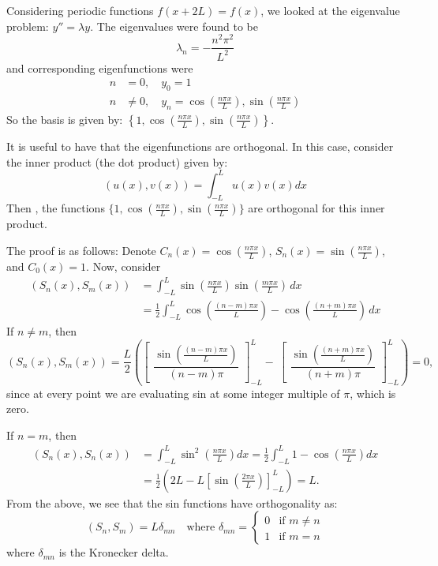 Considering periodic functions $f(x+2L) = f(x)$, we looked at the eigenvalue problem: $y'' = \lambda y$. The eigenvalues were found to be
\[
\lambda_n = -\frac{n^2 \pi^2}{L^2} 
\]
and corresponding eigenfunctions were 
\begin{align*}
	n &= 0, \quad y_0 = 1 \\
	n &\neq 0, \quad y_n = \cos{\left(\frac{n \pi x}{L}\right)}, \sin{\left(\frac{n \pi x}{L}\right)}
\end{align*}
So the basis is given by: $\left\{1, \cos{(\frac{n \pi x}{L})}, \sin{(\frac{n \pi x}{L})}\right\}$.

It is useful to have that the eigenfunctions are orthogonal. In this case, consider the inner product (the dot product) given by:
\begin{equation}\label{eq:innerprod}
	(u(x), v(x)) = \int_{-L}^L u(x) v(x) dx
\end{equation}
Then , the functions $\{1, \cos{(\frac{n \pi x}{L})}, \sin{(\frac{n \pi x}{L})}\}$ are orthogonal for this inner product.

The proof is as follows: Denote $C_n(x) = \cos{(\frac{n \pi x}{L})}$, $S_n(x) = \sin{(\frac{n \pi x}{L})}$, and $C_0(x)=1$. Now, consider
\begin{align*}
	\left(S_n(x), S_m(x)\right) &= \int_{-L}^L \sin{\left(\frac{n \pi x}{L}\right)} \sin{\left(\frac{m \pi x}{L}\right)} \,dx \\
	&= \frac{1}{2} \int_{-L}^L \cos{\left(\frac{(n-m) \pi x}{L}\right)} - \cos{\left(\frac{(n+m) \pi x}{L}\right)} \,dx
\end{align*}
If $n \neq m$, then
\[
\left(S_n(x), S_m(x)\right) = \frac{L}{2} \left(  \begin{bmatrix}\dfrac{\sin{\left(\frac{(n-m) \pi x}{L} \right)} }{(n-m) \pi} \end{bmatrix}_{-L}^L - \ \begin{bmatrix} \dfrac{\sin{\left(\frac{(n+m) \pi x}{L} \right)} }{(n+m) \pi} \end{bmatrix}_{-L}^L \right) = 0,
\]
since at every point we are evaluating sin at some integer multiple of $\pi$, which is zero.

If $n = m$, then
\begin{align*}
	\left(S_n(x), S_n(x)\right) & = \int^L_{-L} \sin^2{\left(\frac{n \pi x}{L}\right)} dx = \frac{1}{2} \int^L_{-L} 1 - \cos{\left(\frac{n \pi x}{L}\right)} dx \\
	&= \frac{1}{2}\left( 2L - L \left[ \sin{\left(\frac{2 \pi x}{L} \right)} \right]_{-L}^L \right) = L.
\end{align*}
From the above, we see that the sin functions have orthogonality as:
\[
(S_n, S_m) = L \delta_{mn} \quad \text{where } \delta_{mn} = \begin{cases}0 & \text{if } m \neq n \\ 1 & \text{if } m = n
\end{cases}
\]
where $\delta_{mn}$ is the Kronecker delta.

